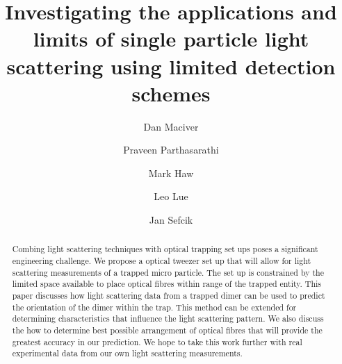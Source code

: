 \documentclass[review,3p]{elsarticle}
\begin{document}
\begin{frontmatter}



\title{Investigating the applications and limits of single particle light scattering using limited detection schemes}


\author[aff1]{Dan Maciver}
\author[aff1]{Praveen Parthasarathi}
\author[aff1]{Mark Haw}
\author[aff1]{Leo Lue}
\author[aff1]{Jan Sefcik}

\begin{abstract}
Combing light scattering techniques with optical trapping set ups poses a significant engineering challenge. We propose a optical tweezer set up that will allow for light scattering measurements of a trapped micro particle. The set up is constrained by the limited space available to place optical fibres within range of the trapped entity. This paper discusses how light scattering data from a trapped dimer can be used to predict the orientation of the dimer within the trap. This method can be extended for determining characteristics that influence the light scattering pattern. We also discuss the how to determine best possible arrangement of optical fibres that will provide the greatest accuracy in our prediction. We hope to take this work further with real experimental data from our own light scattering measurements. 


\end{abstract}
\end{frontmatter}
\end{document}
